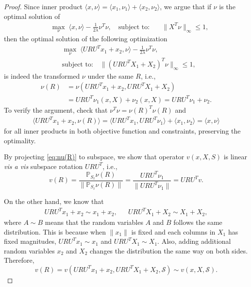 \documentclass[twoside,11pt]{article}
\numberwithin{equation}{section}
\begin{document}
\begin{proof}
Since inner product $\langle x,\nu\rangle = \langle x_1,\nu_1\rangle + \langle x_2,\nu_2\rangle$, we argue that if $\nu$ is the optimal solution of
\begin{align*}
\quad \max_{\nu} \; \langle x,\nu \rangle - \frac{1}{2\lambda}\nu^T\nu,\quad\text{subject to:}\quad &\|X^T\nu\|_{\infty} \leq 1,
\end{align*}
then the optimal solution of the following optimization
\begin{align*}
 &\max_{\nu} \; \langle URU^Tx_1+x_2,\nu \rangle - \frac{1}{2\lambda}\nu^T\nu,\\
&\text{subject to:}\quad \|(URU^TX_1+X_2)^T\nu\|_{\infty} \leq 1,
\end{align*}
is indeed the transformed $\nu$ under the same $R$, i.e.,
\begin{align}
  \nu(R)&=\nu(URU^Tx_1+x_2, URU^TX_1+X_2)\nonumber\\
&=URU^T\nu_1(x,X)+\nu_2(x,X)=URU^T\nu_1 + \nu_2.\label{eq:nu(R)}
\end{align}
To verify the argument, check that $\nu^T\nu = \nu(R)^T\nu(R)$ and
\begin{align*}
\langle URU^Tx_1+x_2,\nu(R)\rangle = \langle URU^Tx_1,URU^T\nu_1\rangle + \langle x_1,\nu_2\rangle
= \langle x,\nu\rangle
\end{align*}
for all inner products in both objective function and constraints, preserving the optimality.

By projecting \eqref{eq:nu(R)} to subspace, we show that operator $v(x,X,S)$ is linear \textit{vis a vis} subspace rotation $URU^T$, i.e.,
\begin{equation}\label{eq:v_linearity}
  v(R) = \frac{\mathbb{P}_{S_{\ell}}\nu(R)}{\|\mathbb{P}_{S_{\ell}}\nu(R)\|} = \frac{URU^T\nu_1}{\|URU^T\nu_1\|}=URU^Tv.
\end{equation}

On the other hand, we know that
\begin{align*}
  URU^Tx_1+x_2 \sim x_1+x_2, &&
  URU^TX_1+X_2 \sim X_1+X_2,
\end{align*}
where $A\sim B$ means that the random variables $A$ and $B$ follows the same distribution.
This is because when
$\|x_1\|$ is fixed and each columns in $X_1$ has fixed magnitudes, $URU^Tx_1 \sim x_1$ and $URU^TX_1 \sim X_1$. Also, adding additional random variables $x_2$ and $X_2$ changes the distribution the same way on both sides. Therefore,
\begin{equation}\label{eq:v_distribution}
  v(R) = v(URU^Tx_1+x_2, URU^TX_1+X_2, \mathcal{S})\sim v(x, X, \mathcal{S}).
\end{equation}


\end{proof}
\end{document}
